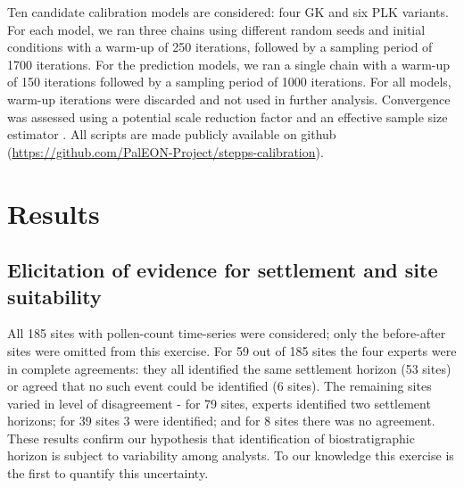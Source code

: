 \documentclass[12pt]{article}
\begin{document}
Ten candidate calibration models are considered: four GK and six PLK
variants. For each model, we ran three chains using different random
seeds and initial conditions with a warm-up of 250 iterations,
followed by a sampling period of 1700 iterations. For the prediction
models, we ran a single chain with a warm-up of 150 iterations
followed by a sampling period of 1000 iterations. For all models,
warm-up iterations were discarded and not used in further
analysis. Convergence was assessed using a potential scale reduction
factor and an effective sample size estimator
\citep{gelman2014bayesian}. All scripts are made publicly available on
github (\url{https://github.com/PalEON-Project/stepps-calibration}).



\section{Results}
\subsection{Elicitation of evidence for settlement and site suitability}

All 185 sites with pollen-count time-series were considered; only the
before-after sites were omitted from this exercise.  For 59 out of 185
sites the four experts were in complete agreements: they all
identified the same settlement horizon (53 sites) or agreed that no
such event could be identified (6 sites). The remaining sites varied
in level of disagreement - for 79 sites, experts identified two
settlement horizons; for 39 sites 3 were identified; and for 8 sites
there was no agreement. These results confirm our hypothesis that
identification of biostratigraphic horizon is subject to variability
among analysts. To our knowledge this exercise is the first to
quantify this uncertainty.
\end{document}
